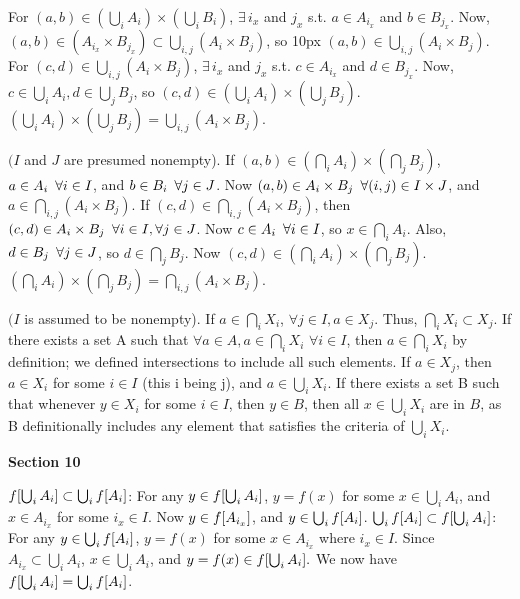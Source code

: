 \documentclass{article}
\DeclarePairedDelimiter\brc{[}{]}
\newcommand{\nl}[0]{\newline}
\begin{document}
\begin{flushleft}
 \nl
For $(a,b) \in (\bigcup_i A_i) \times (\bigcup_i B_i)$, $\exists \, i_x$ and $j_x$ s.t. $a \in A_{i_x}$ and $b \in B_{j_x}$. Now, $(a,b) \in (A_{i_x} \times B_{j_x}) \subset \bigcup_{i,j} (A_i \times B_j)$, so \kern10px $(a,b) \in \bigcup_{i,j} (A_i \times B_j)$. \nl \nl
For $(c,d) \in \bigcup_{i,j} (A_i \times B_j)$, $\exists \, i_x$ and $j_x$ s.t. $c \in A_{i_x}$ and $d \in B_{j_x}$. Now, $c \in \bigcup_i A_i, d \in \bigcup_j B_j$, so $(c,d) \in (\bigcup_i A_i) \times (\bigcup_j B_j).$ \nl \nl
$(\bigcup_i A_i) \times (\bigcup_j B_j) = \bigcup_{i,j} (A_i \times B_j).$ \nl

 \nl
$(I$ and $J$ are presumed nonempty). \nl
If $(a,b) \in (\bigcap_i A_i) \times (\bigcap_j B_j)$, $a \in A_i \kern5px \forall i \in I$, and $b \in B_i \kern5px \forall j \in J$. Now $(a,b) \in A_i \times B_j \kern5px \forall (i,j) \in I \times J$, and $a \in \bigcap_{i,j} (A_i \times B_j)$. \nl \nl
If $(c,d) \in \bigcap_{i,j} (A_i \times B_j)$, then $(c,d) \in A_i \times B_j \kern5px \forall i \in I, \forall j \in J$. Now $c \in A_i \kern5px \forall i \in I$, so $x \in \bigcap_i A_i$. Also, $d \in B_j \kern5px\forall j \in J$, so $d \in \bigcap_j B_j$. Now $(c,d) \in (\bigcap_i A_i) \times (\bigcap_j B_j)$. \nl \nl
$(\bigcap_i A_i) \times (\bigcap_j B_j) = \bigcap_{i,j} (A_i \times B_j)$. \nl

 \nl
$(I$ is assumed to be nonempty). \nl
If $a \in \bigcap_i X_i$, $\forall j \in I, a \in X_j$. Thus, $\bigcap_i X_i \subset X_j$. \nl
If there exists a set A such that $\forall a \in A, a \in \bigcap_i X_i$ $\forall i \in I$, then $a \in \bigcap_i X_i$ by definition; we defined intersections to include all such elements. \nl \nl
If $a \in X_j$, then $a \in X_i$ for some $i \in I$ (this i being j), and $a \in \bigcup_i X_i$. \nl
If there exists a set B such that whenever $y \in X_i$ for some $i \in I$, then $y \in B$, then all $x \in \bigcup_i X_i$ are in $B$, as B definitionally includes any element that satisfies the criteria of $\bigcup_i X_i$. \nl


\centerline{\textbf{Section 10}}

 \nl
$f\brc*{\bigcup_i A_i} \subset \bigcup_i f\brc*{A_i}$: \nl
For any $y \in f\brc*{\bigcup_i A_i}$, $y = f(x)$ for some $x \in \bigcup_i A_i$, and $x \in A_{i_x}$ for some $i_x \in I$. Now $ y \in f\brc*{A_{i_x}}$, and $y \in \bigcup_i f \brc*{A_i}$. \nl \nl
$\bigcup_i f\brc*{A_i} \subset f\brc*{\bigcup_i A_i}$: \nl
For any $y \in \bigcup_i f\brc*{A_i}$, $y = f(x)$ for some $x \in A_{i_x}$ where $i_x \in I$. Since $A_{i_x} \subset \bigcup_i A_i$, $x \in \bigcup_i A_i$, and $y = f(x) \in f\brc*{\bigcup_i A_i}.$ \nl
We now have $f\brc*{\bigcup_i A_i} = \bigcup_i f\brc*{A_i}$. \nl


\end{flushleft}
\end{document}
